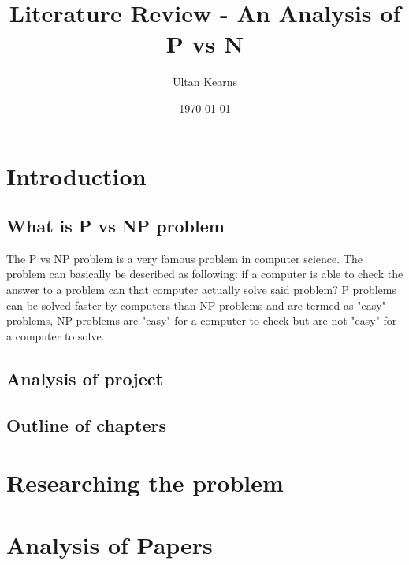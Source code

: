 \documentclass{report}
\title{Literature Review - An Analysis of P vs N}
\author{Ultan Kearns}
\date{\today}
\begin{document}
\maketitle
\tableofcontents
\chapter{Introduction}
\section{What is P vs NP problem}
The P vs NP problem is a very famous problem in computer science.  The problem
can basically be described as following: if a computer is able to check the answer
to a problem can that computer actually solve said problem?\cite{wiki}  P problems can be
solved faster by computers than NP problems and are termed as "easy" problems, NP problems
are "easy" for a computer to check but are not "easy" for a computer to solve.\cite{wiki}

\section{Analysis of project}
\section{Outline of chapters}
\chapter{Researching the problem}
\chapter{Analysis of Papers}


\end{document}
